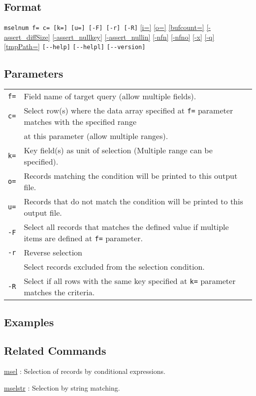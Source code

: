 
\subsection*{Format}
\verb|mselnum f= c= [k=] [u=] [-F] [-r] [-R]|
\hyperref[sect:option_i]{[i=]}
\hyperref[sect:option_o]{[o=]}
\hyperref[sect:option_bufcount]{[bufcount=]} 
\hyperref[sect:option_assert_diffSize]{[-assert\_diffSize]}
\hyperref[sect:option_assert_nullkey]{[-assert\_nullkey]}
\hyperref[sect:option_assert_nullin]{[-assert\_nullin]}
\hyperref[sect:option_nfn]{[-nfn]} 
\hyperref[sect:option_nfno]{[-nfno]}  
\hyperref[sect:option_x]{[-x]}
\hyperref[sect:option_q]{[-q]}
\hyperref[sect:option_option_tmppath]{[tmpPath=]}
\verb|[--help]|
\verb|[--helpl]|
\verb|[--version]|\\

\subsection*{Parameters}
\begin{table}[htbp]
{\small
\begin{tabular}{ll}
\verb|f=|    & Field name of target query (allow multiple fields). \\
\verb|c=|    & Select row(s) where the data array specified at \verb|f=| parameter matches with the specified range\\
		& at this parameter (allow multiple ranges). \\
\verb|k=|    & Key field(s) as unit of selection (Multiple range can be specified).\\

\verb|o=|    & Records matching the condition will be printed to this output file. \\
\verb|u=|    & Records that do not match the condition will be printed to this output file.\\

\verb|-F|    & Select all records that matches the defined value if multiple items are defined at  \verb|f=| parameter. \\  
\verb|-r|    & Reverse selection \\
             & Select records excluded from the selection condition.\\
\verb|-R|    & Select if all rows with the same key specified at \verb|k=| parameter matches the criteria. \\
\end{tabular} 
}
\end{table} 



\subsection*{Examples}


\subsection*{Related Commands}
\hyperref[sect:msel]{msel} : Selection of records by conditional expressions. 

\hyperref[sect:mselstr]{mselstr} : Selection by string matching. 


%
